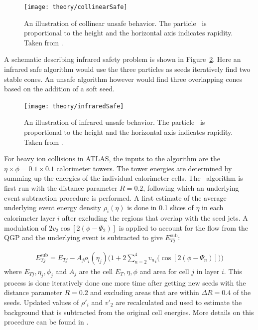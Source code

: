 \begin{figure}[htp]
\centering
\texttt{[image: theory/collinearSafe]}
\caption{An illustration of collinear unsafe behavior.
The particle \pt\ is proportional to the height and the horizontal axis indicates rapidity.
Taken from \cite{Salam:2009jx}.
}
\label{fig:collinearSafe}
\end{figure}


A schematic describing infrared safety problem is shown in Figure~\ref{fig:infraredSafe}.
Here an infrared safe algorithm would use the three particles as seeds iteratively find two stable cones.
An unsafe algorithm however would find three overlapping cones based on the addition of a soft seed.

\begin{figure}[htp]
\centering
\texttt{[image: theory/infraredSafe]}
\caption{An illustration of infrared unsafe behavior.
The particle \pt\ is proportional to the height and the horizontal axis indicates rapidity.
Taken from \cite{Salam_2007}.
}
\label{fig:infraredSafe}
\end{figure}


For heavy ion collisions in ATLAS, the inputs to the algorithm are the $\eta \times \phi = 0.1 \times 0.1$ calorimeter towers.
The tower energies are determined by summing up the energies of the individual calorimeter cells.
The \antikt\ algorithm is first run with the distance parameter $R=0.2$, following which an underlying event subtraction procedure is performed.
A first estimate of the average underlying event energy density $\rho_i (\eta)$ is done in 0.1 slices of $\eta$ in each calorimeter layer $i$ after excluding the regions that overlap with the seed jets.
A modulation of $2v_{2} \cos[2(\phi-\Psi_2)] $ is applied to account for the flow from the QGP and the underlying event is subtracted to give $E_{Tj}^{\mathrm{sub}}$:

\begin{align}
E_{Tj}^{\mathrm{sub}} = E_{Tj} - A_j \rho_i (\eta_j) \Big(1+2 \sum_{n=2}^{4} {v_{n}}_i \big(\cos[2(\phi-\Psi_n)] \big) \Big)
\end{align}
where $E_{Tj} , \eta_j, \phi_j$ and $A_j$ are the cell $E_T, \eta, \phi$ and area for cell $j$ in layer $i$.
This process is done iteratively done one more time after getting new seeds with the distance parameter $R = 0.2$ and excluding areas that are within $\Delta R = 0.4$ of the seeds.
Updated values of $\rho{'}_i$ and $v{'}_2$ are recalculated and used to estimate the background that is subtracted from the original cell energies.
More details on this procedure can be found in \cite{2013220}.



